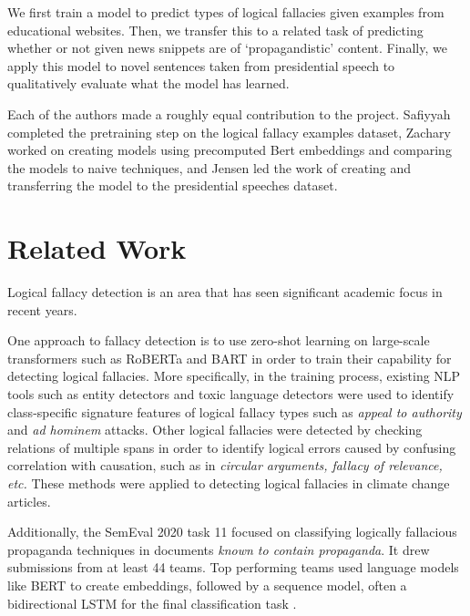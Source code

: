 \documentclass[conference]{IEEEtran}
\begin{document}
We first train a model to predict types of logical fallacies given examples from educational websites. Then, we transfer this to a related task of predicting whether or not given news snippets are of `propagandistic' content. Finally, we apply this model to novel sentences taken from presidential speech to qualitatively evaluate what the model has learned.

Each of the authors made a roughly equal contribution to the project. Safiyyah completed the pretraining step on the logical fallacy examples dataset, Zachary worked on creating models using precomputed Bert embeddings and comparing the models to naive techniques, and Jensen led the work of creating and transferring the model to the presidential speeches dataset.


\section{Related Work}
\label{sec:relatedwork}
Logical fallacy detection  is an area that has seen significant academic focus in recent years. 

One approach to fallacy detection \cite{jin2022logical} is to use zero-shot learning on large-scale transformers such as RoBERTa and BART in order to train their capability for detecting logical fallacies. More specifically, in the training process, existing NLP tools such as entity detectors and toxic language detectors were used to identify class-specific signature features of logical fallacy types such as \emph{appeal to authority} and \emph{ad hominem} attacks. Other logical fallacies were detected by checking relations of multiple spans in order to identify logical errors caused by confusing correlation with causation, such as in \emph{circular arguments, fallacy of relevance, etc.} These methods were applied to detecting logical fallacies in climate change articles.

Additionally, the SemEval 2020 task 11 focused on classifying logically fallacious propaganda techniques in documents \emph{known to contain propaganda}. It drew submissions from at least 44 teams. Top performing teams used language models like BERT to create embeddings, followed by a sequence model, often a bidirectional LSTM for the final classification task \cite{2020-semeval-task-11}. 
\end{document}
